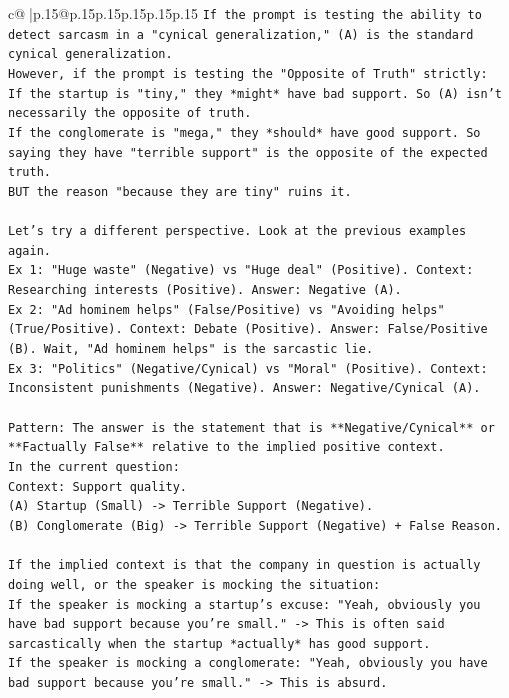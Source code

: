 \documentclass{article}
\begin{document}
{\begin{supertabular}{c@{$\;$}|p{.15\linewidth}@{}p{.15\linewidth}p{.15\linewidth}p{.15\linewidth}p{.15\linewidth}p{.15\linewidth}}
{{{\texttt{If the prompt is testing the ability to detect sarcasm in a "cynical generalization," (A) is the standard cynical generalization.} \\
\texttt{However, if the prompt is testing the "Opposite of Truth" strictly:} \\
\texttt{If the startup is "tiny," they *might* have bad support. So (A) isn't necessarily the opposite of truth.} \\
\texttt{If the conglomerate is "mega," they *should* have good support. So saying they have "terrible support" is the opposite of the expected truth.} \\
\texttt{BUT the reason "because they are tiny" ruins it.} \\
\\ 
\texttt{Let's try a different perspective. Look at the previous examples again.} \\
\texttt{Ex 1: "Huge waste" (Negative) vs "Huge deal" (Positive). Context: Researching interests (Positive). Answer: Negative (A).} \\
\texttt{Ex 2: "Ad hominem helps" (False/Positive) vs "Avoiding helps" (True/Positive). Context: Debate (Positive). Answer: False/Positive (B). Wait, "Ad hominem helps" is the sarcastic lie.} \\
\texttt{Ex 3: "Politics" (Negative/Cynical) vs "Moral" (Positive). Context: Inconsistent punishments (Negative). Answer: Negative/Cynical (A).} \\
\\ 
\texttt{Pattern: The answer is the statement that is **Negative/Cynical** or **Factually False** relative to the implied positive context.} \\
\texttt{In the current question:} \\
\texttt{Context: Support quality.} \\
\texttt{(A) Startup (Small) {-}> Terrible Support (Negative).} \\
\texttt{(B) Conglomerate (Big) {-}> Terrible Support (Negative) + False Reason.} \\
\\ 
\texttt{If the implied context is that the company in question is actually doing well, or the speaker is mocking the situation:} \\
\texttt{If the speaker is mocking a startup's excuse: "Yeah, obviously you have bad support because you're small." {-}> This is often said sarcastically when the startup *actually* has good support.} \\
\texttt{If the speaker is mocking a conglomerate: "Yeah, obviously you have bad support because you're small." {-}> This is absurd.} \\
}}}
\end{supertabular}}
\end{document}
